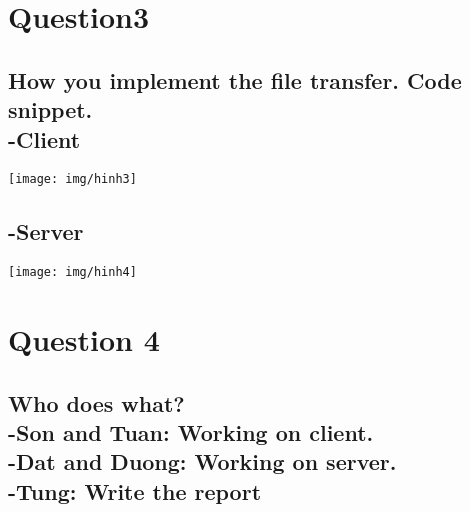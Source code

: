 \documentclass{article}
\begin{document}
\section{Question3}
\subsection{How you implement the file transfer. Code snippet.\\ -Client}
\texttt{[image: img/hinh3]}
\subsection{-Server}
\texttt{[image: img/hinh4]}
\section{Question 4}
\subsection{Who does what?\\
-Son and Tuan: Working on client.\\
-Dat and Duong: Working on server.\\
-Tung: Write the report
}
\end{document}
